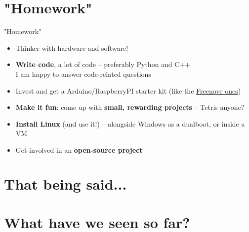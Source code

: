 \documentclass[compress]{beamer}
\begin{document}
\section[]{"Homework"}


\begin{frame}{"Homework"}
    \begin{itemize}
        \item<+-> Thinker with hardware and software!
        \item<+-> \textbf{Write code}, a lot of code -- preferably Python and C++ \\
                I am happy to answer code-related questions
        \item<+-> Invest  and get a Arduino/RaspberryPI starter kit (like the \href{https://www.amazon.co.uk/s?merchant=A3DM8VCGJL5PKR&fallThrough=1}{Freenove ones})
        \item<+-> \textbf{Make it fun}: come up with \textbf{small, rewarding projects} -- Tetris anyone?
        \item<+-> \textbf{Install Linux} (and use it!) -- alongside Windows as a dualboot, or inside a VM
        \item<+-> Get involved in an \textbf{open-source project}

    \end{itemize}
\end{frame}


\section[]{That being said...}


\section[Pepper demo]{What have we seen so far?}
\end{document}
